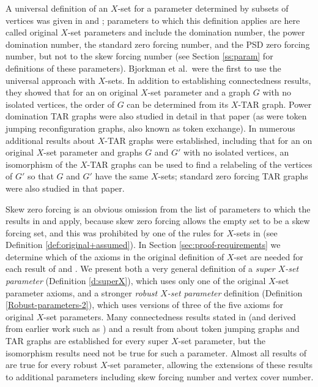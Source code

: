 \documentclass{article}
\numberwithin{figure}{section}
\numberwithin{table}{section}
\numberwithin{equation}{section}
\theoremstyle{definition}
\theoremstyle{definition}
\theoremstyle{definition}
\newcommand{\Xo}{X}
\begin{document}
A universal definition of an $X$-set for a parameter  determined by subsets of vertices was given in \cite{PDrecon} and \cite{XTARiso}; parameters to which this definition applies are here called original $X$-set parameters and include the domination number, the power domination number,  the standard zero forcing number,   and the PSD zero forcing number, but not to the skew forcing number (see Section \ref{ss:param} for definitions of these parameters). 
Bjorkman et al.\  were the first to use the universal approach with $X$-sets. In addition to establishing  connectedness results,  they showed that  for an on original $X$-set parameter and  a graph $G$ with no isolated vertices, the order of $G$ can be determined from its $X$-TAR graph.   Power domination TAR graphs were  also studied  in detail in that paper (as were token jumping reconfiguration graphs, also known as token exchange).  In \cite{XTARiso} numerous additional results about $X$-TAR graphs were established, including that  for an on original $X$-set parameter and  graphs $G$ and $G'$ with no isolated vertices, an isomorphism of the $\Xo$-TAR graphs can be used to find a relabeling of the vertices of $G'$ so that $G$ and $G'$ have the same $X$-sets; standard zero forcing  TAR graphs were also studied  in that paper. 

Skew zero  forcing is an obvious omission from the list of parameters to which the results in \cite{PDrecon} and \cite{XTARiso} apply, because skew zero forcing allows the empty set to be a skew forcing set, and this was prohibited by one of the rules for $X$-sets in \cite{PDrecon,XTARiso} (see Definition \ref{def:original+assumed}).
In Section \ref{sec:proof-requirements} we determine which of the  axioms in the original definition of $X$-set are needed for each result of \cite{PDrecon} and \cite{XTARiso}. 
We present both a   very general definition of a  \emph{super $X$-set parameter}  (Definition \ref{d:superX}), which uses only one of the original $X$-set parameter axioms, and a stronger  \emph{robust $X$-set parameter} definition   (Definition \ref{Robust-parameters-2}),  which uses versions of  three of the  five axioms for original $X$-set parameters.  Many connectedness results  stated in \cite{PDrecon} (and derived from earlier work such as \cite{HS14}) and a result from \cite{KMM12} about token jumping graphs and TAR graphs  are established for every super $X$-set parameter, but  the isomorphism results need not be true for such a parameter.
Almost all results of \cite{PDrecon,XTARiso} are true for every robust $X$-set parameter, allowing the extensions of these results to  additional parameters including skew forcing number and vertex cover number. 
\end{document}
